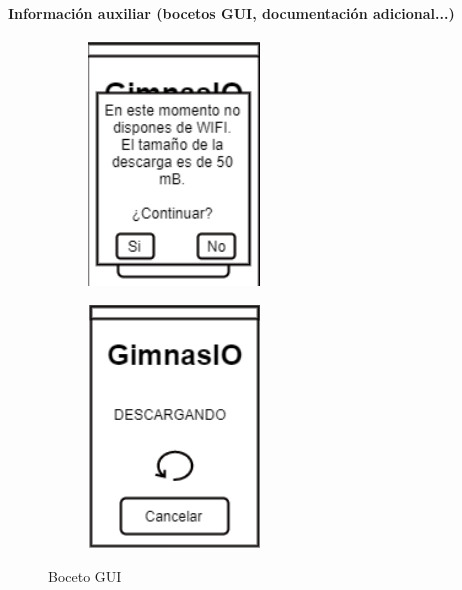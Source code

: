 \documentclass[11pt,a4paper]{report}
\begin{document}
\paragraph{Información auxiliar (bocetos GUI, documentación adicional...)}
\begin{figure}[H]
	\begin{minipage}[b]{0.5\linewidth} %
		\begin{figure}[H]
			\centering
			\includegraphics[width=0.5\textwidth]{capturicas/guipbidownload1.png}
			\label{fig: guipbi1}
		\end{figure}
	\end{minipage}
	\hspace{0.2cm} %
	\begin{minipage}[b]{0.5\linewidth}
		\begin{figure}[H]
			\centering
			\includegraphics[width=0.5\textwidth]{capturicas/guipbidownload2.png}
			\label{fig: guipbi2}
		\end{figure}
	\end{minipage}
	\caption{Boceto GUI}
\end{figure}
\end{document}
